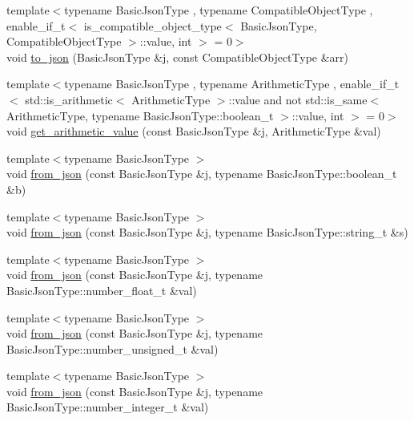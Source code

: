 \begin{DoxyCompactItemize}
{\footnotesize template$<$typename Basic\+Json\+Type , typename Compatible\+Object\+Type , enable\+\_\+if\+\_\+t$<$ is\+\_\+compatible\+\_\+object\+\_\+type$<$ Basic\+Json\+Type, Compatible\+Object\+Type $>$\+::value, int $>$  = 0$>$ }\\void \mbox{\hyperlink{namespacenlohmann_1_1detail_a6fa2f784014bfc0b62d7a35d51e676c9}{to\+\_\+json}} (Basic\+Json\+Type \&j, const Compatible\+Object\+Type \&arr)
\item 
{\footnotesize template$<$typename Basic\+Json\+Type , typename Arithmetic\+Type , enable\+\_\+if\+\_\+t$<$ std\+::is\+\_\+arithmetic$<$ Arithmetic\+Type $>$\+::value and not std\+::is\+\_\+same$<$ Arithmetic\+Type, typename Basic\+Json\+Type\+::boolean\+\_\+t $>$\+::value, int $>$  = 0$>$ }\\void \mbox{\hyperlink{namespacenlohmann_1_1detail_a85955b9c6dd31846e4b8e891f78614b6}{get\+\_\+arithmetic\+\_\+value}} (const Basic\+Json\+Type \&j, Arithmetic\+Type \&val)
\item 
{\footnotesize template$<$typename Basic\+Json\+Type $>$ }\\void \mbox{\hyperlink{namespacenlohmann_1_1detail_a58117f225f43d03e3a0a4a6f3d77c9d9}{from\+\_\+json}} (const Basic\+Json\+Type \&j, typename Basic\+Json\+Type\+::boolean\+\_\+t \&b)
\item 
{\footnotesize template$<$typename Basic\+Json\+Type $>$ }\\void \mbox{\hyperlink{namespacenlohmann_1_1detail_ad74d89f77ada7a57eff38b43d4bf2335}{from\+\_\+json}} (const Basic\+Json\+Type \&j, typename Basic\+Json\+Type\+::string\+\_\+t \&s)
\item 
{\footnotesize template$<$typename Basic\+Json\+Type $>$ }\\void \mbox{\hyperlink{namespacenlohmann_1_1detail_a7cb5dd7d46a60e65f9a8e0873b3f7dd8}{from\+\_\+json}} (const Basic\+Json\+Type \&j, typename Basic\+Json\+Type\+::number\+\_\+float\+\_\+t \&val)
\item 
{\footnotesize template$<$typename Basic\+Json\+Type $>$ }\\void \mbox{\hyperlink{namespacenlohmann_1_1detail_ace4d5680ba413d9fd897ccb5d9c61a1c}{from\+\_\+json}} (const Basic\+Json\+Type \&j, typename Basic\+Json\+Type\+::number\+\_\+unsigned\+\_\+t \&val)
\item 
{\footnotesize template$<$typename Basic\+Json\+Type $>$ }\\void \mbox{\hyperlink{namespacenlohmann_1_1detail_a047d881e611fcac709dc318f730a1732}{from\+\_\+json}} (const Basic\+Json\+Type \&j, typename Basic\+Json\+Type\+::number\+\_\+integer\+\_\+t \&val)

\end{DoxyCompactItemize}
